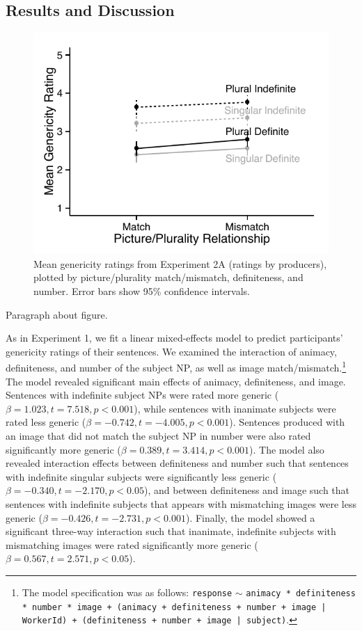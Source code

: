 \documentclass[10pt,letterpaper]{article}
\begin{document}
\subsection{Results and Discussion}

\begin{figure}[t]
\centering
\includegraphics[width=\linewidth]{figures/e2a_mod.pdf}
\caption{\label{fig:e2a} Mean genericity ratings from Experiment 2A (ratings by producers), plotted by picture/plurality match/mismatch, definiteness, and number. Error bars show 95\% confidence intervals.} 
\end{figure}

Paragraph about figure.

As in Experiment 1, we fit a linear mixed-effects model to predict participants' genericity ratings of their sentences. We examined the interaction of animacy, definiteness, and number of the subject NP, as well as image match/mismatch.\footnote{The model specification was as follows: \texttt{response} \(\sim\) \texttt{animacy * definiteness * number * image + (animacy + definiteness + number + image | WorkerId) + (definiteness + number + image | subject)}.} The model revealed significant main effects of animacy, definiteness, and image. Sentences with indefinite subject NPs were rated more generic (\(\beta = 1.023, t = 7.518, p < 0.001\)), while sentences with inanimate subjects were rated less generic (\(\beta = -0.742, t = -4.005, p < 0.001\)). Sentences produced with an image that did not match the subject NP in number were also rated significantly more generic (\(\beta = 0.389, t = 3.414, p < 0.001\)). The model also revealed interaction effects between definiteness and number such that sentences with indefinite singular subjects were significantly less generic (\(\beta = -0.340, t= -2.170, p < 0.05\)), and between definiteness and image such that sentences with indefinite subjects that appears with mismatching images were less generic (\(\beta = -0.426, t = -2.731, p < 0.001\)). Finally, the model showed a significant three-way interaction such that inanimate, indefinite subjects with mismatching images were rated significantly more generic (\(\beta = 0.567, t = 2.571, p < 0.05\)).
\end{document}
